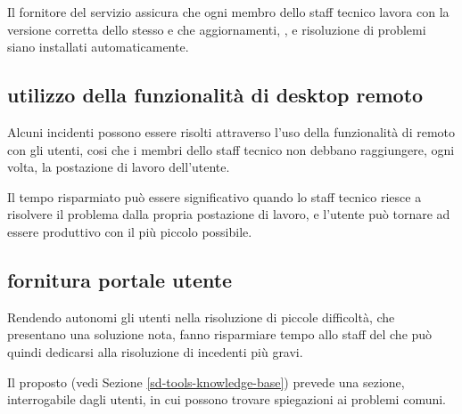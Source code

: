 Il fornitore del servizio  assicura che ogni membro dello staff tecnico lavora con la versione corretta dello stesso e che aggiornamenti, , e risoluzione di problemi siano installati automaticamente.

\subsection[Utilizzo della funzionalità di desktop remoto]{utilizzo della funzionalità di desktop remoto}
\label{sd-users-experience-remote-desktop}
Alcuni incidenti possono essere risolti attraverso l'uso della funzionalità di  remoto con gli utenti, cosi che i membri dello staff tecnico non debbano raggiungere, ogni volta, la postazione di lavoro dell'utente.

Il tempo risparmiato può essere significativo quando lo staff tecnico riesce a risolvere il problema dalla propria postazione di lavoro, e l'utente può tornare ad essere produttivo con il più piccolo  possibile.

\subsection[Fornitura portale utente]{fornitura portale utente}
\label{sd-user-experience-help}
Rendendo autonomi gli utenti nella risoluzione di piccole difficoltà, che presentano una soluzione nota, fanno risparmiare tempo allo staff del  che può quindi dedicarsi alla risoluzione di incedenti più gravi.

Il  proposto (vedi Sezione \ref{sd-tools-knowledge-base}) prevede una sezione, interrogabile dagli utenti, in cui possono trovare spiegazioni ai problemi comuni.